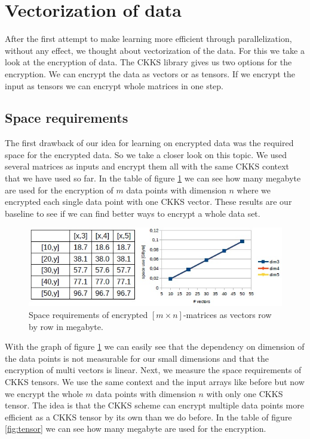 \section{Vectorization of data}\label{vectorization}
\begin{text}
After the first attempt to make learning more efficient through parallelization, without any effect, we thought about vectorization of the data. For this we take a look at the encryption of data. The CKKS library gives us two options for the encryption. We can encrypt the data as vectors or as tensors. If we encrypt the input as tensors we can encrypt whole matrices in one step.
\end{text}

\subsection{Space requirements}
\begin{text}
The first drawback of our idea for learning on encrypted data was the required space for the encrypted data. So we take a closer look on this topic. We used several matrices as inputs and encrypt them all with the same CKKS context that we have used so far. In the table of figure \ref{fig:baseline} we can see how many megabyte are used for the encryption of $m$ data points with dimension $n$ where we encrypted each single data point with one CKKS vector. These results are our baseline to see if we can find better ways to encrypt a whole data set.
\end{text}

\begin{figure}[ht]
\centering
\includegraphics[width=1\linewidth]{images/baseline.jpg}
\caption{Space requirements of encrypted $[m\times n]$-matrices as vectors row by row in megabyte.}
\label{fig:baseline}
\end{figure} 

\begin{text}
With the graph of figure \ref{fig:baseline} we can easily see that the dependency on dimension of the data points is not measurable for our small dimensions and that the encryption of multi vectors is linear. \newline
\indent Next, we measure the space requirements of CKKS tensors. We use the same context and the input arrays like before but now we encrypt the whole $m$ data points with dimension $n$ with only one CKKS tensor. The idea is that the CKKS scheme can encrypt multiple data points more efficient as a CKKS tensor by its own than we do before. In the table of figure \ref{fig:tensor} we can see how many megabyte are used for the encryption.
\end{text}

